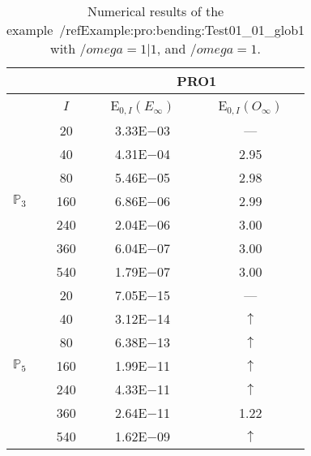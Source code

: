 \begin{table}[H]
\caption{Numerical results of the example~/ref{Example:pro:bending:Test01_01_glob1} with $/omega=1|1$, and $/omega=1$.}
\setlength{\tabcolsep}{5pt}
\centering
\begin{tabular}{@{}l c c c@{}}
\toprule
 &  & \multicolumn{2}{c}{PRO1}\\
\midrule
 & $I$ & E$_{0,I}(E_{\infty})$ & E$_{0,I}(O_{\infty})$\\
\midrule
\multirow{7}{*}{$\mathbb{P}_{3}$}
 & 20 & 3.33E$-$03 & ---\\
 & 40 & 4.31E$-$04 & 2.95\\
 & 80 & 5.46E$-$05 & 2.98\\
 & 160 & 6.86E$-$06 & 2.99\\
 & 240 & 2.04E$-$06 & 3.00\\
 & 360 & 6.04E$-$07 & 3.00\\
 & 540 & 1.79E$-$07 & 3.00\\
\midrule
\multirow{7}{*}{$\mathbb{P}_{5}$}
 & 20 & 7.05E$-$15 & ---\\
 & 40 & 3.12E$-$14 & $\uparrow$\\
 & 80 & 6.38E$-$13 & $\uparrow$\\
 & 160 & 1.99E$-$11 & $\uparrow$\\
 & 240 & 4.33E$-$11 & $\uparrow$\\
 & 360 & 2.64E$-$11 & 1.22\\
 & 540 & 1.62E$-$09 & $\uparrow$\\
\bottomrule
\end{tabular}
\label{Table:pRO:test_01_01_test9_pro2}
\end{table}
